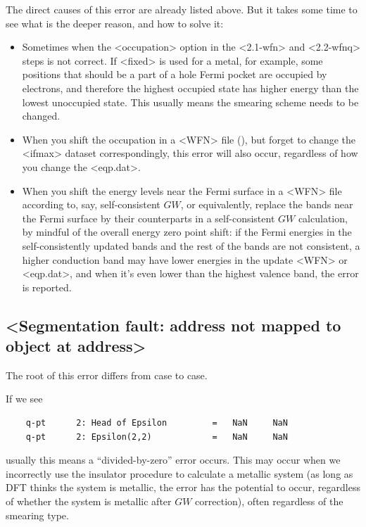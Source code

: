 \documentclass[hyperref, a4paper, 12pt]{report}
\def\texttt#1{<#1>}%
\newcommand{\shortcode}[1]{\texttt{#1}}
\begin{document}
The direct causes of this error are already listed above.
But it takes some time to see what is the deeper reason, 
and how to solve it:
\begin{itemize}
    \item Sometimes when the \shortcode{occupation} option 
    in the \shortcode{2.1-wfn} and \shortcode{2.2-wfnq} steps 
    is not correct.
    If \shortcode{fixed} is used for a metal, for example, 
    some positions that should be a part of a hole Fermi pocket 
    are occupied by electrons,
    and therefore the highest occupied state has higher energy than the lowest unoccupied state.
    This usually means the smearing scheme needs to be changed.
    \item When you shift the occupation in a \shortcode{WFN} file (), 
    but forget to change the \shortcode{ifmax} dataset correspondingly, 
    this error will also occur,
    regardless of how you change the \shortcode{eqp.dat}.
    \item When you shift the energy levels near the Fermi surface  
        in a \shortcode{WFN} file
        according to, say, self-consistent $GW$,
        or equivalently, replace the bands near the Fermi surface 
        by their counterparts in a self-consistent $GW$ calculation,
        by mindful of the overall energy zero point shift: 
        if the Fermi energies in the self-consistently updated bands 
        and the rest of the bands are not consistent, 
        a higher conduction band may have lower energies 
        in the update \shortcode{WFN} or \shortcode{eqp.dat}, 
        and when it's even lower than the highest valence band, 
        the error is reported.
\end{itemize}

\subsection{\shortcode{Segmentation fault: address not mapped to object at address}}\label{sec:segment-fault-1}

The root of this error differs from case to case.

If we see 
\begin{lstlisting}
    q-pt      2: Head of Epsilon         =   NaN     NaN    
    q-pt      2: Epsilon(2,2)            =   NaN     NaN    
\end{lstlisting}
usually this means a ``divided-by-zero'' error occurs.
This may occur when we incorrectly use the insulator procedure to calculate a metallic system 
(as long as DFT thinks the system is metallic, the error has the potential to occur,
regardless of whether the system is metallic after $GW$ correction),
often regardless of the smearing type. 
\end{document}
